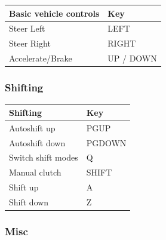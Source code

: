 \begin{tabular}{ |l|l| } 
\hline
Basic vehicle controls & Key \\
\hline
Steer Left & LEFT \\
\hline
Steer Right & RIGHT \\
\hline
Accelerate/Brake & UP / DOWN \\
\hline
\end{tabular}

\hypertarget{shifting}{%
\subsubsection{Shifting}\label{shifting}}

\begin{tabular}{ |l|l| } 
\hline
Shifting & Key \\
\hline
Autoshift up & PGUP \\
\hline
Autoshift down & PGDOWN \\
\hline
Switch shift modes & Q \\
\hline
Manual clutch & SHIFT \\
\hline
Shift up & A \\
\hline
Shift down & Z \\
\hline
\end{tabular}


\hypertarget{misc}{%
\subsubsection{Misc}\label{misc}}

